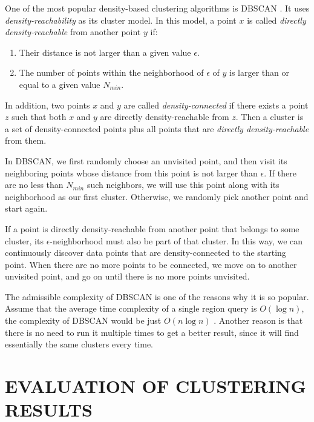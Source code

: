 \documentclass[conference]{IEEEtran}
\begin{document}
One of the most popular density-based clustering algorithms is DBSCAN \cite{ester1996density}. It uses \textit{density-reachability} as its cluster model. In this model, a point $x$ is called \textit{directly density-reachable} from another point $y$ if:

\begin{enumerate}
	\item Their distance is not larger than a given value $\epsilon$.
	\item The number of points within the neighborhood of $\epsilon$ of $y$ is larger than or equal to a given value $N_{min}$.
\end{enumerate}

In addition, two points $x$ and $y$ are called \textit{density-connected} if there exists a point $z$ such that both $x$ and $y$ are directly density-reachable from $z$. Then a cluster is a set of density-connected points plus all points that are \textit{directly density-reachable} from them.

In DBSCAN, we first randomly choose an unvisited point, and then visit its neighboring points whose distance from this point is not larger than $\epsilon$. If there are no less than $N_{min}$ such neighbors, we will use this point along with its neighborhood as our first cluster. Otherwise, we randomly pick another point and start again.

If a point is directly density-reachable from another point that belongs to some cluster, its $\epsilon$-neighborhood must also be part of that cluster. In this way, we can continuously discover data points that are density-connected to the starting point. When there are no more points to be connected, we move on to another unvisited point, and go on until there is no more points unvisited.

The admissible complexity of DBSCAN is one of the reasons why it is so popular. Assume that the average time complexity of a single region query is $O(\log n)$, the complexity of DBSCAN would be just $O(n \log n)$ \cite{ester1996density}. Another reason is that there is no need to run it multiple times to get a better result, since it will find essentially the same clusters every time.

\section{EVALUATION OF CLUSTERING RESULTS} \label{sec:evaluation}
\end{document}
